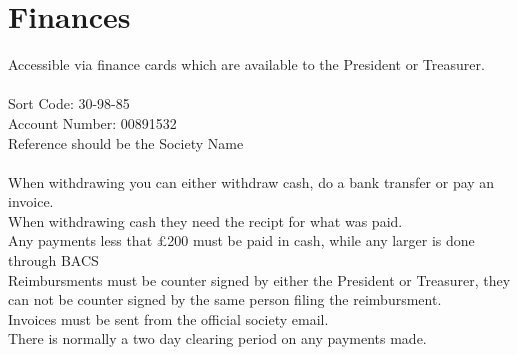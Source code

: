 \documentclass[12pt,a4paper]{article}
\begin{document}
\section{Finances}
	Accessible via finance cards which are available to the President or Treasurer. \\
	\\
	Sort Code: 30-98-85 \\
	Account Number: 00891532 \\
	Reference should be the Society Name \\
	\\
	When withdrawing you can either withdraw cash, do a bank transfer or pay an invoice. \\
	When withdrawing cash they need the recipt for what was paid. \\
	Any payments less that £200 must be paid in cash, while any larger is done through BACS \\
	Reimbursments must be counter signed by either the President or Treasurer, they can not be counter signed by the same person filing the reimbursment. \\
	Invoices must be sent from the official society email. \\
	There is normally a two day clearing period on any payments made. \\
\end{document}
